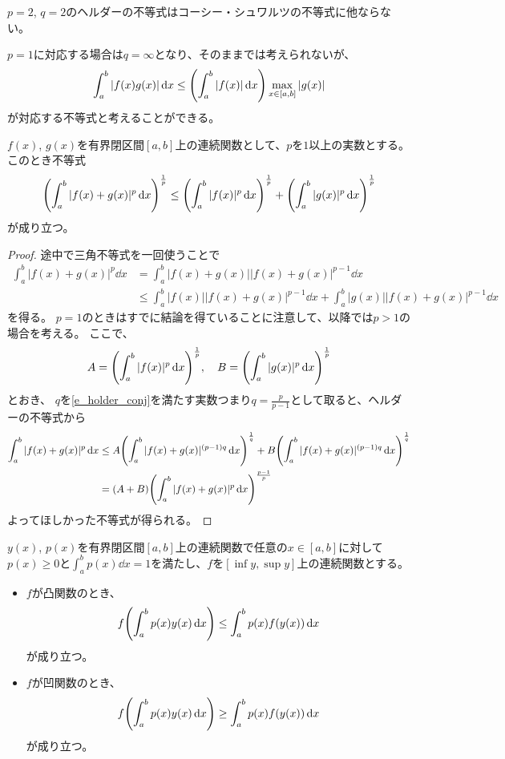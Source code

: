 \begin{remark}
$p = 2$, $q = 2$のヘルダーの不等式はコーシー・シュワルツの不等式に他ならない。
\end{remark}

\begin{remark}
$p = 1$に対応する場合は$q = \infty$となり、そのままでは考えられないが、
$$
\int_a^b |f(x)g(x)|\dd{x} \le \qty(\int_a^b |f(x)|\dd{x})\max_{x \in [a, b]}|g(x)|
$$
が対応する不等式と考えることができる。
\end{remark}

\begin{theorem}[ミンコフスキーの不等式]
$f(x)$, $g(x)$を有界閉区間$[a, b]$上の連続関数として、$p$を$1$以上の実数とする。
このとき不等式
$$
\qty(\int_a^b |f(x)+g(x)|^p\dd{x})^{\frac{1}{p}} \le \qty(\int_a^b |f(x)|^p\dd{x})^{\frac{1}{p}}+\qty(\int_a^b |g(x)|^p\dd{x})^{\frac{1}{p}}
$$
が成り立つ。
\end{theorem}

\begin{proof}
途中で三角不等式を一回使うことで
$$
\begin{aligned}
\int_a^b |f(x)+g(x)|^p\dd{x}
&= \int_a^b |f(x)+g(x)||f(x)+g(x)|^{p-1}\dd{x} \\
&\le \int_a^b |f(x)||f(x)+g(x)|^{p-1}\dd{x}+\int_a^b |g(x)||f(x)+g(x)|^{p-1}\dd{x}
\end{aligned}
$$
を得る。
$p = 1$のときはすでに結論を得ていることに注意して、以降では$p > 1$の場合を考える。
ここで、
$$
A = \qty(\int_a^b |f(x)|^p\dd{x})^{\frac{1}{p}},
\quad B = \qty(\int_a^b |g(x)|^p\dd{x})^{\frac{1}{p}}
$$
とおき、
$q$を\eqref{e_holder_conj}を満たす実数つまり$q = \frac{p}{p-1}$として取ると、ヘルダーの不等式から
$$
\begin{aligned}
\int_a^b |f(x)+g(x)|^p\dd{x}
&\le A\qty(\int_a^b |f(x)+g(x)|^{(p-1)q}\dd{x})^{\frac{1}{q}}+B\qty(\int_a^b |f(x)+g(x)|^{(p-1)q}\dd{x})^{\frac{1}{q}} \\
&= (A+B)\qty(\int_a^b |f(x)+g(x)|^p\dd{x})^{\frac{p-1}{p}}
\end{aligned}
$$
よってほしかった不等式が得られる。
\end{proof}

\begin{theorem}[イェンセンの不等式]
$y(x)$, $p(x)$を有界閉区間$[a, b]$上の連続関数で任意の$x \in [a, b]$に対して$p(x) \ge 0$と$\int_a^b p(x)\dd{x} = 1$を満たし、$f$を$[\inf y, \sup y]$上の連続関数とする。
\begin{itemize}
\item
$f$が凸関数のとき、
$$
f\qty(\int_a^b p(x)y(x)\dd{x}) \le \int_a^b p(x)f(y(x))\dd{x}
$$
が成り立つ。
\item
$f$が凹関数のとき、
$$
f\qty(\int_a^b p(x)y(x)\dd{x}) \ge \int_a^b p(x)f(y(x))\dd{x}
$$
が成り立つ。
\end{itemize}
\end{theorem}

